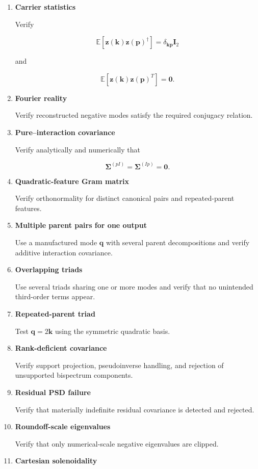 \documentclass[
  11pt,
  a4paper,
]{article}
\begin{document}
\begin{enumerate}
\def\labelenumi{\arabic{enumi}.}
\item
  \textbf{Carrier statistics}

  Verify

  \[
  \mathbb E[
  \boldsymbol z(\boldsymbol k)
  \boldsymbol z(\boldsymbol p)^\dagger
  ]
  =
  \delta_{\boldsymbol k\boldsymbol p}\boldsymbol I_2
  \]

  and

  \[
  \mathbb E[
  \boldsymbol z(\boldsymbol k)
  \boldsymbol z(\boldsymbol p)^T
  ]
  =
  \boldsymbol0.
  \]
\item
  \textbf{Fourier reality}

  Verify reconstructed negative modes satisfy the required conjugacy
  relation.
\item
  \textbf{Pure--interaction covariance}

  Verify analytically and numerically that

  \[
  \boldsymbol\Sigma^{(pI)}
  =
  \boldsymbol\Sigma^{(Ip)}
  =
  \boldsymbol0.
  \]
\item
  \textbf{Quadratic-feature Gram matrix}

  Verify orthonormality for distinct canonical pairs and repeated-parent
  features.
\item
  \textbf{Multiple parent pairs for one output}

  Use a manufactured mode \(\boldsymbol q\) with several parent
  decompositions and verify additive interaction covariance.
\item
  \textbf{Overlapping triads}

  Use several triads sharing one or more modes and verify that no
  unintended third-order terms appear.
\item
  \textbf{Repeated-parent triad}

  Test \(\boldsymbol q=2\boldsymbol k\) using the symmetric quadratic
  basis.
\item
  \textbf{Rank-deficient covariance}

  Verify support projection, pseudoinverse handling, and rejection of
  unsupported bispectrum components.
\item
  \textbf{Residual PSD failure}

  Verify that materially indefinite residual covariance is detected and
  rejected.
\item
  \textbf{Roundoff-scale eigenvalues}

  Verify that only numerical-scale negative eigenvalues are clipped.
\item
  \textbf{Cartesian solenoidality}


\end{enumerate}
\end{document}
